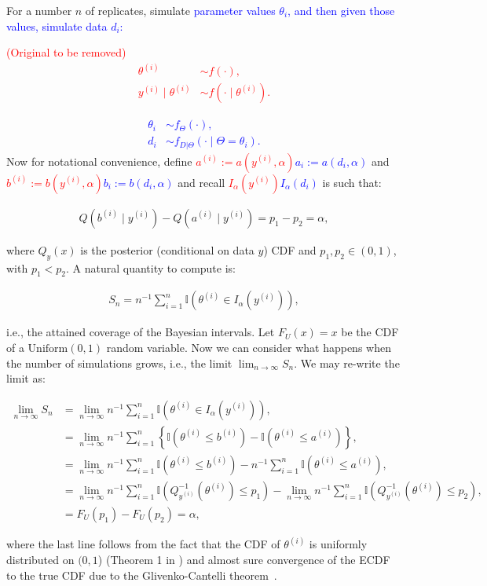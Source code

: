 \documentclass[oneside]{article}
\begin{document}
For a number $n$ of replicates, simulate \textcolor{blue}{parameter
  values $\theta_i$, and then given those values, simulate data $d_i$:}

\textcolor{red}{
  (Original to be removed)
\begin{align*}
\theta^{(i)} &\sim f(\cdot),\\
y^{(i)} \mid \theta^{(i)} &\sim f(\cdot \mid \theta^{(i)}).
\end{align*}
}

\textcolor{blue}{
\begin{align*}
\theta_i & \sim f_\Theta(\cdot), \\
d_i & \sim f_{D|\Theta}(\cdot \mid \Theta=\theta_i).
\end{align*}
}
Now for notational convenience, define \textcolor{red}{\st{$a^{(i)} := a(y^{(i)}, \alpha)$}}\textcolor{blue}{$a_i := a(d_i, \alpha)$} and \textcolor{red}{\st{$b^{(i)} := b(y^{(i)}, \alpha)$}}\textcolor{blue}{$b_i := b(d_i, \alpha)$} and recall \textcolor{red}{\st{$I_{\alpha}\left(y^{(i)}\right)$}}\textcolor{blue}{$I_{\alpha}\left(d_i\right)$} is such that:

\begin{align*}
Q\left(b^{(i)} \mid y^{(i)}\right) - Q\left(a^{(i)} \mid y^{(i)}\right) = p_1 - p_2 = \alpha,
\end{align*}

\noindent where $Q_{y}(x)$ is the posterior (conditional on data $y$) CDF and $p_1, p_2 \in (0,1)$, with $p_1 < p_2$.
A natural quantity to compute is:

\begin{align*}
S_n = n^{-1}\sum_{i=1}^n \mathbb{I}\left(\theta^{(i)} \in I_{\alpha}\left(y^{(i)}\right) \right),
\end{align*}

\noindent i.e., the attained coverage of the Bayesian intervals.
Let $F_U(x) = x$ be the CDF of a $\operatorname{Uniform(0, 1)}$ random variable. 
Now we can consider what happens when the number of simulations grows, i.e., the limit $\lim_{n \to \infty} S_n$.
We may re-write the limit as:

\begin{align*}
\lim_{n \to \infty} S_n &= \lim_{n \to \infty} n^{-1}\sum_{i=1}^n \mathbb{I}\left(\theta^{(i)} \in I_{\alpha}\left(y^{(i)}\right) \right),\\
&=  \lim_{n \to \infty} n^{-1}\sum_{i=1}^n \left\{ \mathbb{I}\left(\theta^{(i)} \leq b^{(i)} \right) - \mathbb{I}\left(\theta^{(i)} \leq a^{(i)} \right) \right\},\\
&=  \lim_{n \to \infty} n^{-1}\sum_{i=1}^n \mathbb{I}\left(\theta^{(i)} \leq b^{(i)} \right) -  n^{-1}\sum_{i=1}^n\mathbb{I}\left(\theta^{(i)} \leq a^{(i)} \right),\\
&=  \lim_{n \to \infty} n^{-1}\sum_{i=1}^n \mathbb{I}\left(Q_{y^{(i)}}^{-1}\left(\theta^{(i)}\right) \leq p_1 \right) -   \lim_{n \to \infty} n^{-1}\sum_{i=1}^n\mathbb{I}\left(Q_{y^{(i)}}^{-1}\left(\theta^{(i)}\right) \leq p_2 \right),\\
&= F_U(p_1) - F_U(p_2) = \alpha,
\end{align*}

\noindent where the last line follows from the fact that the CDF of $\theta^{(i)}$ is uniformly distributed on $(0, 1$) (Theorem 1 in \cite{Cook2006}) and almost sure convergence of the ECDF to the true CDF due to the  Glivenko-Cantelli theorem~\cite[page 275]{Billingsley1986}.

\end{document}
